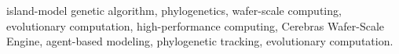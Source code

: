 

\begin{IEEEkeywords}
island-model genetic algorithm, phylogenetics, wafer-scale computing, evolutionary computation, high-performance computing, Cerebras Wafer-Scale Engine, agent-based modeling, phylogenetic tracking, evolutionary computation.
\end{IEEEkeywords}
